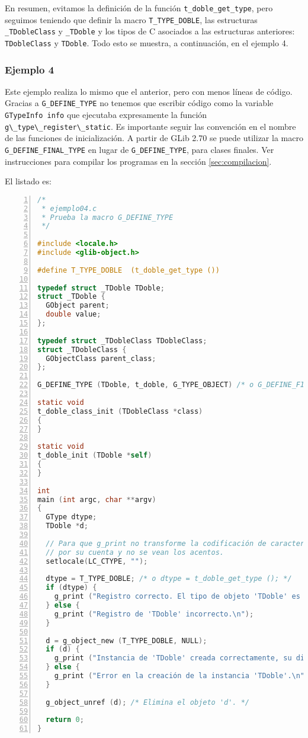 En resumen, evitamos la definición de la función \texttt{t\_doble\_get\_type}, pero seguimos
teniendo que definir la macro \texttt{T\_TYPE\_DOBLE}, las estructuras \texttt{\_TDobleClass} y
\texttt{\_TDoble} y los tipos de C asociados a las estructuras anteriores: \texttt{TDobleClass}
y \texttt{TDoble}.
Todo esto se muestra, a continuación, en el ejemplo 4.

\subsubsection{Ejemplo 4}
Este ejemplo realiza lo mismo que el anterior, pero con menos líneas de código.
Gracias a \texttt{G\_DEFINE\_TYPE} no tenemos que escribir código como la variable \texttt{GTypeInfo info}
que  ejecutaba  expresamente la función  \passthrough{\lstinline!g\_type\_register\_static!}.
Es importante seguir las convención en el nombre de las funciones de inicialización.
A partir de \textsf{GLib 2.70} se puede utilizar la macro \texttt{G\_DEFINE\_FINAL\_TYPE} en lugar de
\texttt{G\_DEFINE\_TYPE}, para clases finales.
Ver instrucciones para compilar los programas en la sección \ref{sec:compilacion}.

El listado es:
\begin{lstlisting}[language=C, numbers=left]
/*
 * ejemplo04.c
 * Prueba la macro G_DEFINE_TYPE
 */

#include <locale.h>
#include <glib-object.h>

#define T_TYPE_DOBLE  (t_doble_get_type ())

typedef struct _TDoble TDoble;
struct _TDoble {
  GObject parent;
  double value;
};

typedef struct _TDobleClass TDobleClass;
struct _TDobleClass {
  GObjectClass parent_class;
};

G_DEFINE_TYPE (TDoble, t_doble, G_TYPE_OBJECT) /* o G_DEFINE_FINAL_TYPE (...) */

static void
t_doble_class_init (TDobleClass *class)
{
}

static void
t_doble_init (TDoble *self)
{
}

int
main (int argc, char **argv)
{
  GType dtype;
  TDoble *d;

  // Para que g_print no transforme la codificación de caracteres
  // por su cuenta y no se vean los acentos.
  setlocale(LC_CTYPE, "");
  
  dtype = T_TYPE_DOBLE; /* o dtype = t_doble_get_type (); */
  if (dtype) {
    g_print ("Registro correcto. El tipo de objeto 'TDoble' es %lx.\n", dtype);
  } else {
    g_print ("Registro de 'TDoble' incorrecto.\n");
  }

  d = g_object_new (T_TYPE_DOBLE, NULL);
  if (d) {
    g_print ("Instancia de 'TDoble' creada correctamente, su dirección es %p.\n", d);
  } else {
    g_print ("Error en la creación de la instancia 'TDoble'.\n");
  }

  g_object_unref (d); /* Elimina el objeto 'd'. */

  return 0;
}
\end{lstlisting}

